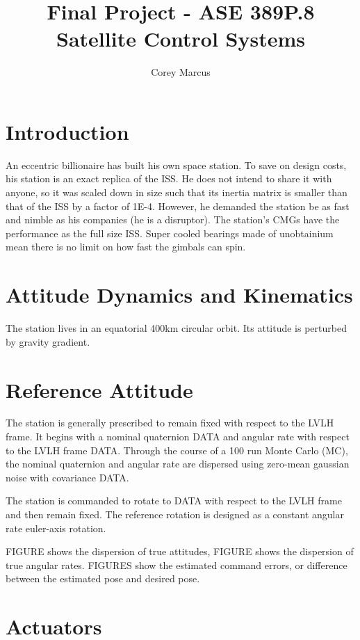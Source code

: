\documentclass[]{article}
\title{Final Project - ASE 389P.8 Satellite Control Systems}
\author{Corey Marcus}
\begin{document}
\maketitle

\newcommand{\CrossProd}[1]{\left[ #1 \times \right]}

\section{Introduction}

An eccentric billionaire has built his own space station. To save on design costs, his station is an exact replica of the ISS. He does not intend to share it with anyone, so it was scaled down in size such that its inertia matrix is smaller than that of the ISS by a factor of 1E-4. However, he demanded the station be as fast and nimble as his companies (he is a disruptor). The station's CMGs have the performance as the full size ISS. Super cooled bearings made of unobtainium mean there is no limit on how fast the gimbals can spin. 

\section{Attitude Dynamics and Kinematics}

The station lives in an equatorial 400km circular orbit. Its attitude is perturbed by gravity gradient.

\section{Reference Attitude}

The station is generally prescribed to remain fixed with respect to the LVLH frame. It begins with a nominal quaternion DATA and angular rate with respect to the LVLH frame DATA. Through the course of a 100 run Monte Carlo (MC), the nominal quaternion and angular rate are dispersed using zero-mean gaussian noise with covariance DATA.

The station is commanded to rotate to DATA with respect to the LVLH frame and then remain fixed. The reference rotation is designed as a constant angular rate euler-axis rotation.

FIGURE shows the dispersion of true attitudes, FIGURE shows the dispersion of true angular rates. FIGURES show the estimated command errors, or difference between the estimated pose and desired pose.

\section{Actuators}
\end{document}
